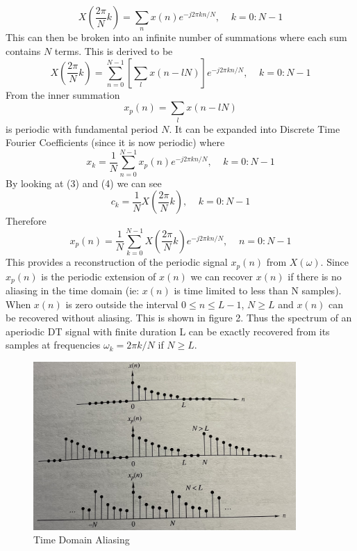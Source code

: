 \documentclass{article} %
\begin{document}
	\begin{equation}
	X(\frac{2\pi}{N}k) = \sum_n x(n)e^{-j2\pi kn/N}, \;\;\;\; k = 0:N-1
	\end{equation}
	This can then be broken into an infinite number of summations where each sum contains $N$ terms. This is derived to be
	\begin{equation}
	X(\frac{2\pi}{N}k) = \sum_{n=0}^{N-1} [ \sum_l x(n-lN)]e^{-j2\pi kn/N}, \;\;\;\; k = 0:N-1
	\end{equation}
	From the inner summation
	\begin{equation}
	x_p(n) = \sum_l x(n-lN)
	\end{equation}
	is periodic with fundamental period $N$. It can be expanded into Discrete Time Fourier Coefficients (since it is now periodic) where
	\begin{equation}
	x_k = \frac{1}{N}\sum_{n=0}^{N-1} x_p(n)e^{-j2\pi kn/N}, \;\;\;\; k = 0:N-1
	\end{equation}
	By looking at (3) and (4) we can see
	\begin{equation}
	c_k = \frac{1}{N} X(\frac{2\pi}{N}k), \;\;\;\; k = 0:N-1
	\end{equation}
	Therefore 
	\begin{equation}
	x_p(n) = \frac{1}{N}\sum_{k=0}^{N-1} X(\frac{2\pi}{N}k) e^{-j2\pi kn/N}, \;\;\;\; n = 0:N-1
	\end{equation}
	This provides a reconstruction of the periodic signal $x_p(n)$ from $X(\omega)$. Since $x_p(n)$ is the periodic extension of $x(n)$ we can recover $x(n)$ if there is no aliasing in the time domain (ie: $x(n)$ is time limited to less than N samples). When $x(n)$ is zero outside the interval $0 \le n \le L - 1$, $N \ge L$ and $x(n)$ can be recovered without aliasing. This is shown in figure 2. Thus the spectrum of an aperiodic DT signal with finite duration L can be exactly recovered from its samples at frequencies $\omega_k = 2\pi k/N$ if $N \ge L$. 
	
	\begin{figure}[h]
	\centering
	\includegraphics[width=10cm]{dft_alias}
	\caption{Time Domain Aliasing}
	\end{figure}
	
\end{document}
